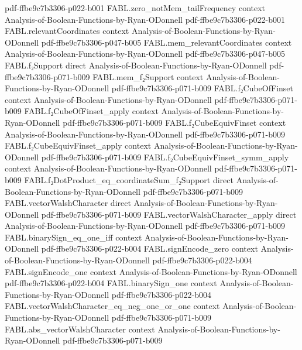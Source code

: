 \begin{theorem}
  {pdf-ffbe9c7b3306-p022-b001}
\proofstep
  {FABL.zero_notMem_tailFrequency}
  {context}
  {Analysis-of-Boolean-Functions-by-Ryan-ODonnell}
  {pdf-ffbe9c7b3306-p022-b001}
\proofstep
  {FABL.relevantCoordinates}
  {context}
  {Analysis-of-Boolean-Functions-by-Ryan-ODonnell}
  {pdf-ffbe9c7b3306-p047-b005}
\proofstep
  {FABL.mem_relevantCoordinates}
  {context}
  {Analysis-of-Boolean-Functions-by-Ryan-ODonnell}
  {pdf-ffbe9c7b3306-p047-b005}
\proofstep
  {FABL.f₂Support}
  {direct}
  {Analysis-of-Boolean-Functions-by-Ryan-ODonnell}
  {pdf-ffbe9c7b3306-p071-b009}
\proofstep
  {FABL.mem_f₂Support}
  {context}
  {Analysis-of-Boolean-Functions-by-Ryan-ODonnell}
  {pdf-ffbe9c7b3306-p071-b009}
\proofstep
  {FABL.f₂CubeOfFinset}
  {context}
  {Analysis-of-Boolean-Functions-by-Ryan-ODonnell}
  {pdf-ffbe9c7b3306-p071-b009}
\proofstep
  {FABL.f₂CubeOfFinset_apply}
  {context}
  {Analysis-of-Boolean-Functions-by-Ryan-ODonnell}
  {pdf-ffbe9c7b3306-p071-b009}
\proofstep
  {FABL.f₂CubeEquivFinset}
  {context}
  {Analysis-of-Boolean-Functions-by-Ryan-ODonnell}
  {pdf-ffbe9c7b3306-p071-b009}
\proofstep
  {FABL.f₂CubeEquivFinset_apply}
  {context}
  {Analysis-of-Boolean-Functions-by-Ryan-ODonnell}
  {pdf-ffbe9c7b3306-p071-b009}
\proofstep
  {FABL.f₂CubeEquivFinset_symm_apply}
  {context}
  {Analysis-of-Boolean-Functions-by-Ryan-ODonnell}
  {pdf-ffbe9c7b3306-p071-b009}
\proofstep
  {FABL.f₂DotProduct_eq_coordinateSum_f₂Support}
  {direct}
  {Analysis-of-Boolean-Functions-by-Ryan-ODonnell}
  {pdf-ffbe9c7b3306-p071-b009}
\proofstep
  {FABL.vectorWalshCharacter}
  {direct}
  {Analysis-of-Boolean-Functions-by-Ryan-ODonnell}
  {pdf-ffbe9c7b3306-p071-b009}
\proofstep
  {FABL.vectorWalshCharacter_apply}
  {direct}
  {Analysis-of-Boolean-Functions-by-Ryan-ODonnell}
  {pdf-ffbe9c7b3306-p071-b009}
\proofstep
  {FABL.binarySign_eq_one_iff}
  {context}
  {Analysis-of-Boolean-Functions-by-Ryan-ODonnell}
  {pdf-ffbe9c7b3306-p022-b004}
\proofstep
  {FABL.signEncode_zero}
  {context}
  {Analysis-of-Boolean-Functions-by-Ryan-ODonnell}
  {pdf-ffbe9c7b3306-p022-b004}
\proofstep
  {FABL.signEncode_one}
  {context}
  {Analysis-of-Boolean-Functions-by-Ryan-ODonnell}
  {pdf-ffbe9c7b3306-p022-b004}
\proofstep
  {FABL.binarySign_one}
  {context}
  {Analysis-of-Boolean-Functions-by-Ryan-ODonnell}
  {pdf-ffbe9c7b3306-p022-b004}
\proofstep
  {FABL.vectorWalshCharacter_eq_neg_one_or_one}
  {context}
  {Analysis-of-Boolean-Functions-by-Ryan-ODonnell}
  {pdf-ffbe9c7b3306-p071-b009}
\proofstep
  {FABL.abs_vectorWalshCharacter}
  {context}
  {Analysis-of-Boolean-Functions-by-Ryan-ODonnell}
  {pdf-ffbe9c7b3306-p071-b009}

\end{theorem}
